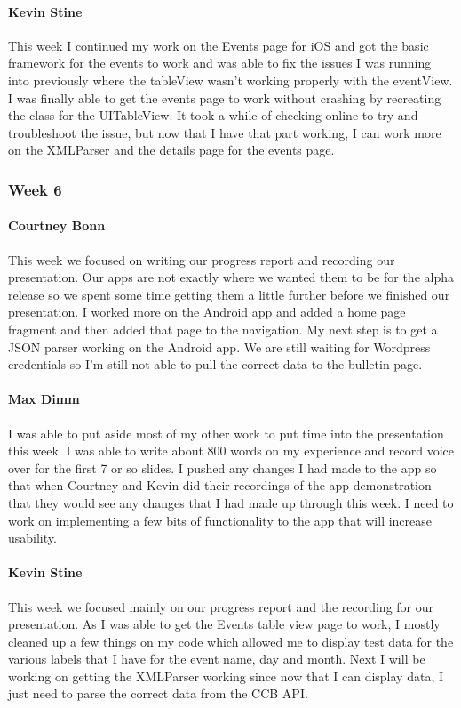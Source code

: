 			\paragraph{Kevin Stine}
			This week I continued my work on the Events page for iOS and got the basic framework for the events to work and was able to fix the issues I was running into previously where the tableView wasn't working properly with the eventView. I was finally able to get the events page to work without crashing by recreating the class for the UITableView. It took a while of checking online to try and troubleshoot the issue, but now that I have that part working, I can work more on the XMLParser and the details page for the events page.

		\subsubsection{Week 6}

			\paragraph{Courtney Bonn}
			This week we focused on writing our progress report and recording our presentation. Our apps are not exactly where we wanted them to be for the alpha release so we spent some time getting them a little further before we finished our presentation. I worked more on the Android app and added a home page fragment and then added that page to the navigation. My next step is to get a JSON parser working on the Android app. We are still waiting for Wordpress credentials so I'm still not able to pull the correct data to the bulletin page.

			\paragraph{Max Dimm}
			I was able to put aside most of my other work to put time into the presentation this week. I was able to write about 800 words on my experience and record voice over for the first 7 or so slides. I pushed any changes I had made to the app so that when Courtney and Kevin did their recordings of the app demonstration that they would see any changes that I had made up through this week. I need to work on implementing a few bits of functionality to the app that will increase usability.

			\paragraph{Kevin Stine}
			This week we focused mainly on our progress report and the recording for our presentation. As I was able to get the Events table view page to work, I mostly cleaned up a few things on my code which allowed me to display test data for the various labels that I have for the event name, day and month. Next I will be working on getting the XMLParser working since now that I can display data, I just need to parse the correct data from the CCB API.

